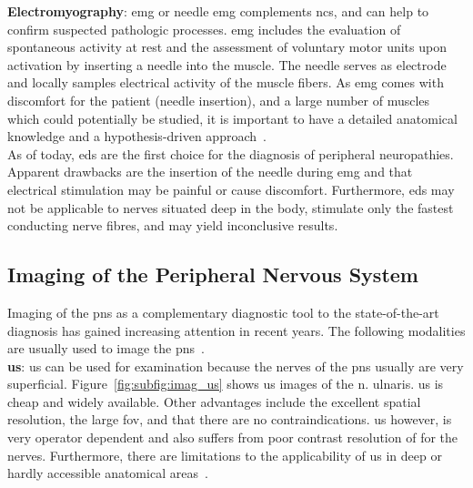 \textbf{Electromyography}: \gls{emg} or needle \gls{emg} complements \gls{ncs}, and can help to confirm suspected pathologic processes. \gls{emg} includes the evaluation of spontaneous activity at rest and the assessment of voluntary motor units upon activation by inserting a needle into the muscle. The needle serves as electrode and locally samples electrical activity of the muscle fibers. As \gls{emg} comes with discomfort for the patient (needle insertion), and a large number of muscles which could potentially be studied, it is important to have a detailed anatomical knowledge and a hypothesis-driven approach~\cite{Mohassel2015}.\\
As of today, \gls{eds} are the first choice for the diagnosis of peripheral neuropathies. Apparent drawbacks are the insertion of the needle during \gls{emg} and that electrical stimulation may be painful or cause discomfort. Furthermore, \gls{eds} may not be applicable to nerves situated deep in the body, stimulate only the fastest conducting nerve fibres, and may yield inconclusive results.

\subsection{Imaging of the Peripheral Nervous System}
Imaging of the \gls{pns} as a complementary diagnostic tool to the state-of-the-art diagnosis has gained increasing attention in recent years. The following modalities are usually used to image the \gls{pns}~\cite{Ohana2014CurrentSystem}.\\

\textbf{\gls{us}}: \gls{us} can be used for examination because the nerves of the \gls{pns} usually are very superficial. Figure~\ref{fig:subfig:imag_us} shows \gls{us} images of the \gls{n.} ulnaris. \gls{us} is cheap and widely available. Other advantages include the excellent spatial resolution, the large \gls{fov}, and that there are no contraindications. \gls{us} however, is very operator dependent and also suffers from poor contrast resolution of for the nerves. Furthermore, there are limitations to the applicability of \gls{us} in deep or hardly accessible anatomical areas~\cite{Ohana2014CurrentSystem}.\\

